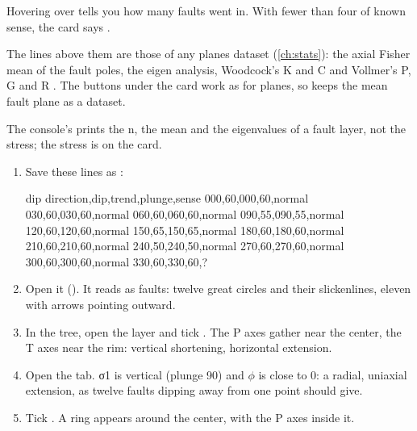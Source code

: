 Hovering over  tells you how many faults went in. With fewer than four of known sense, the
card says .


The lines above them are those of any planes dataset (\cref{ch:stats}): the axial Fisher mean of the
fault poles, the eigen analysis, Woodcock's K and C \parencite{woodcock1977} and Vollmer's P, G and R
\parencite{vollmer1990}. The buttons under the card work as for planes, so  keeps the mean fault plane as a dataset.

\begin{note}
The console's  prints the n, the mean and the eigenvalues of a fault layer, not the stress;
the stress is on the card.
\end{note}

\begin{tryit}
\begin{enumerate}
\item Save these lines as :
\begin{codeblock}
dip direction,dip,trend,plunge,sense
000,60,000,60,normal
030,60,030,60,normal
060,60,060,60,normal
090,55,090,55,normal
120,60,120,60,normal
150,65,150,65,normal
180,60,180,60,normal
210,60,210,60,normal
240,50,240,50,normal
270,60,270,60,normal
300,60,300,60,normal
330,60,330,60,?
\end{codeblock}
\item Open it (). It reads as faults: twelve great circles and their
slickenlines, eleven with arrows pointing outward.
\item In the tree, open the  layer and tick . The P axes gather near the
center, the T axes near the rim: vertical shortening, horizontal extension.
\item Open the  tab. σ1 is vertical (plunge 90) and $\phi$ is close to 0: a radial,
uniaxial extension, as twelve faults dipping away from one point should give.
\item Tick . A ring appears around the center, with the P axes inside it.
\end{enumerate}
\end{tryit}
